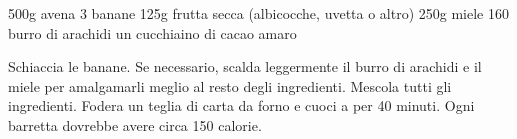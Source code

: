 \begin{ingreds}
	500g avena 
	3 banane 
	125g frutta secca (albicocche, uvetta o altro)
	250g miele 
	160 burro di arachidi 
	un cucchiaino di cacao amaro 

\end{ingreds}

\begin{method}
	Schiaccia le banane. Se necessario, scalda leggermente il burro di arachidi e il miele per amalgamarli meglio al resto degli ingredienti. Mescola tutti gli ingredienti. Fodera un teglia di carta da forno e cuoci a  per 40 minuti. Ogni barretta dovrebbe avere circa 150 calorie.
\end{method}




